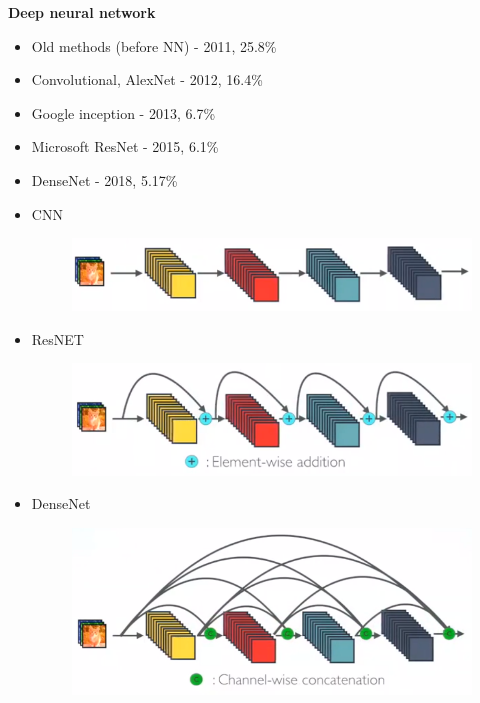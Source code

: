 \documentclass[xcolor=dvipsnames]{beamer}
\begin{document}
\begin{frame}{\bf Deep neural network}

\begin{itemize}
  \item Old methods (before NN) - 2011, 25.8\%
  \item Convolutional, AlexNet - 2012, 16.4\%
  \item Google inception - 2013, 6.7\%
  \item Microsoft ResNet - 2015, 6.1\%
  \item DenseNet - 2018, 5.17\%
\end{itemize}

\begin{itemize}

    \item CNN
    \begin{figure}
      \includegraphics[scale=0.15]{../../diagrams/dnn_conv.png}
    \end{figure}

    \item ResNET
    \begin{figure}
      \includegraphics[scale=0.15]{../../diagrams/dnn_resnet.png}
    \end{figure}

    \item DenseNet
    \begin{figure}
      \includegraphics[scale=0.15]{../../diagrams/dnn_densenet.png}
    \end{figure}

\end{itemize}

\end{frame}
\end{document}
